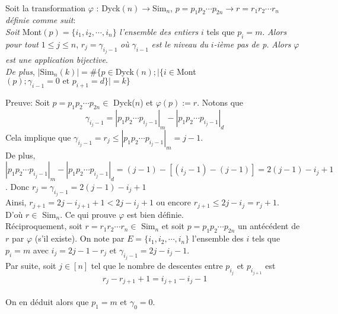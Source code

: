 \begin{proposition} \label{phi_tsfm} \text{ }\\
	Soit la transformation $\varphi$ : $ $\rm{Dyck}$(n) \longrightarrow $\rm{Sim}$_n$, $p=p_{1}p_{2}\cdots p_{2n} \longrightarrow r=r_{1}r_{2}\cdots r_{n}$ \textit{définie comme suit}:\\
	\textit{Soit} \rm{Mont}$(p)=\{i_{1}, i_{2}, \cdots, i_{n}\}$ \textit{l'ensemble des entiers} $i$ tels que $p_{i}=m$. \textit{Alors pour tout }$1\leq j \leq n$, $r_{j} = \gamma_{i_{j}-1}$ \textit{où} $\gamma_{i-1}$ \textit{est le niveau du} $i$\textit{-ième pas de p.}
	\textit{Alors} $\varphi$ \textit{est une application bijective}.\\
	\textit{De plus}, $|$\rm{Sim}$_{n}(k)| = \# \{p \in $\rm{Dyck}$(n); |\{i \in $\rm{Mont}$(p); \gamma_{i-1}=0 \text{ et } p_{i+1}=d\}|=k\}$
\end{proposition}
Preuve:
Soit $p=p_{1}p_{2}\cdots p_{2n} \in $ \rm{Dyck}($n$) et $\varphi(p):=r$. 
Notons que $$\gamma_{i_{j}-1}= | p_{1}p_{2}\cdots p_{i_{j}-1} |_{m} - | p_{1}p_{2}\cdots p_{i_{j}-1} |_{d}$$ 
Cela implique que $\gamma_{i_{j}-1} = r_{j} \leq | p_{1}p_{2}\cdots p_{i_{j}-1} |_{m}=j-1$.\\
De plus, $| p_{1}p_{2}\cdots p_{i_{j}-1} |_{m} - | p_{1}p_{2}\cdots p_{i_{j}-1} |_{d}= (j-1)-[(i_{j}-1)-(j-1)]=2(j-1)-i_{j}+1$. 
Donc $r_{j} = \gamma_{i_{j}-1} = 2(j-1)-i_{j}+1$\\
Ainsi, $r_{j+1}=2j - i_{j+1}+1< 2j -i_{j}+1$ ou encore $r_{j+1}\leq 2j-i_{j}=r_{j}+1$.\\ D'où $r\in $\rm{ Sim}$_{n}$. Ce qui prouve $\varphi$ est bien définie.\vspace{10pt}\\
Réciproquement, soit $r=r_{1}r_{2}\cdots r_{n}\in $\rm{ Sim}$_{n}$ et soit $p=p_{1}p_{2}\cdots p_{2n}$ un antécédent de $r$ par $\varphi$ (s'il existe). On note par $E=\{i_{1}, i_{2}, \cdots, i_{n}\}$ l'ensemble des $i$ tels que $p_{i}=m$ avec $i_{j}=2j-1-r_{j}$ et
$\gamma_{i_{j}-1}=2j-i_{j}-1$. \\
Par suite, soit $j \in [n]$ tel que le nombre de descentes entre $p_{i_{j}}$ et $p_{i_{j+1}}$ est $$r_{j}-r_{j+1}+1=i_{j+1}-i_{j}-1$$\\
On en déduit alors que $p_{1}=m$ et $\gamma_{0}=0$.\\
